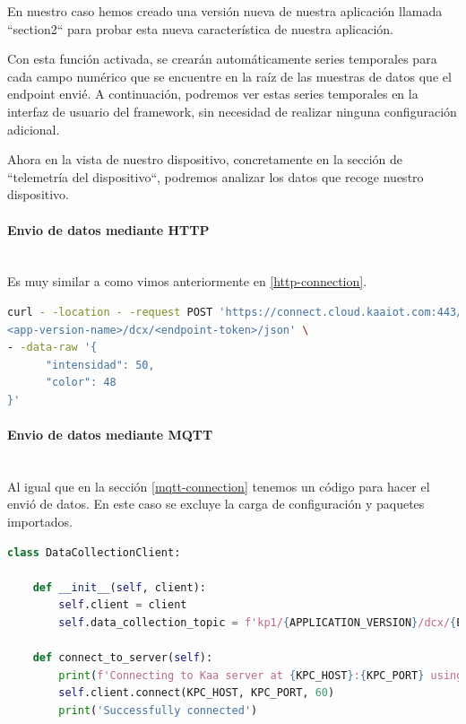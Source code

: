 {En nuestro caso hemos creado una versión nueva de nuestra aplicación llamada ``section2`` para probar esta nueva característica de nuestra aplicación.

Con esta función activada, se crearán automáticamente series temporales para cada campo numérico que se encuentre en la raíz de las muestras de datos que el endpoint envié. A continuación, podremos ver estas series temporales en la interfaz de usuario del framework, sin necesidad de realizar ninguna configuración adicional.

Ahora en la vista de nuestro dispositivo, concretamente en la sección de ``telemetría del dispositivo``, podremos analizar los datos que recoge nuestro dispositivo.

\paragraph{Envio de datos mediante HTTP} \hspace{0pt} \\

Es muy similar a como vimos anteriormente en \ref{http-connection}.

\begin{lstlisting}[language=bash]
curl - -location - -request POST 'https://connect.cloud.kaaiot.com:443/kp1/
<app-version-name>/dcx/<endpoint-token>/json' \
- -data-raw '{
      "intensidad": 50,
      "color": 48
}'
\end{lstlisting}



\paragraph{Envio de datos mediante MQTT} \hspace{0pt} \\

Al igual que en la sección \ref{mqtt-connection} tenemos un código para hacer el envió de datos. En este caso se excluye la carga de configuración y paquetes importados.

\begin{lstlisting}[language=Python]
class DataCollectionClient:

    def __init__(self, client):
        self.client = client
        self.data_collection_topic = f'kp1/{APPLICATION_VERSION}/dcx/{ENDPOINT_TOKEN}/json'

    def connect_to_server(self):
        print(f'Connecting to Kaa server at {KPC_HOST}:{KPC_PORT} using application version {APPLICATION_VERSION} and endpoint token {ENDPOINT_TOKEN}')
        self.client.connect(KPC_HOST, KPC_PORT, 60)
        print('Successfully connected')


\end{lstlisting}}
